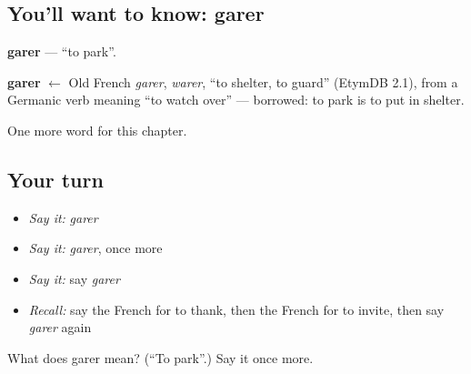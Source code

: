 \subsection*{You'll want to know: garer}
\textbf{garer} — \textquotedblleft{}to park\textquotedblright{}.

\begin{cousinweb}
\textbf{garer} $\leftarrow$ Old French \emph{garer}, \emph{warer}, \textquotedblleft{}to shelter, to guard\textquotedblright{} (EtymDB 2.1), from a Germanic verb meaning \textquotedblleft{}to watch over\textquotedblright{} — borrowed: to park is to put in shelter.
\end{cousinweb}

\begin{grammarlens}[title={What you've built}]
One more word for this chapter.
\end{grammarlens}

\subsection*{Your turn}
\begin{itemize}
\raggedright
  \item \emph{Say it:} \emph{garer}
  \item \emph{Say it:} \emph{garer}, once more
  \item \emph{Say it:} say \emph{garer}
  \item \emph{Recall:} say the French for to thank, then the French for to invite, then say \emph{garer} again
\end{itemize}

\begin{tcolorbox}[breakable,colback=teal!4,colframe=teal!35!black,title={Before you move on}]
What does garer mean? (\textquotedblleft{}To park\textquotedblright{}.) Say it once more.
\end{tcolorbox}
